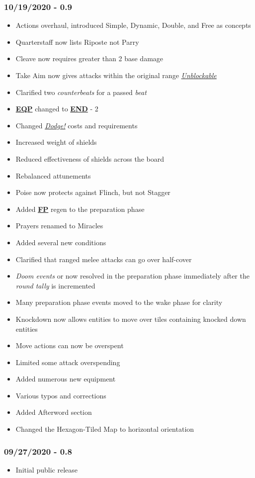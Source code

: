 \documentclass[12pt]{article}
\newcommand{\refto}[1]{\hyperlink{#1}{\textbf{#1}}}
\newcommand{\reftoit}[1]{\hyperlink{#1}{\emph{#1}}}
\begin{document}
\begin{multicols*}{2}
\subsubsection*{10/19/2020 - 0.9}
\begin{itemize}
\item Actions overhaul, introduced Simple, Dynamic, Double, and Free as concepts
\item Quarterstaff now lists Riposte not Parry
\item Cleave now requires greater than 2 base damage
\item Take Aim now gives attacks within the original range \reftoit{Unblockable}
\item Clarified two \emph{counterbeats} for a passed \emph{beat}
\item \refto{EQP} changed to \refto{END} - 2
\item Changed \reftoit{Dodge!} costs and requirements
\item Increased weight of shields
\item Reduced effectiveness of shields across the board
\item Rebalanced attunements
\item Poise now protects against Flinch, but not Stagger
\item Added \refto{FP} regen to the preparation phase
\item Prayers renamed to Miracles
\item Added several new conditions
\item Clarified that ranged melee attacks can go over half-cover
\item \emph{Doom events} or now resolved in the preparation phase immediately after the \emph{round tally} is incremented
\item Many preparation phase events moved to the wake phase for clarity
\item Knockdown now allows entities to move over tiles containing knocked down entities
\item Move actions can now be overspent
\item Limited some attack overspending
\item Added numerous new equipment
\item Various typos and corrections
\item Added Afterword section
\item Changed the Hexagon-Tiled Map to horizontal orientation
\end{itemize}
\subsubsection*{09/27/2020 - 0.8}
\begin{itemize}
\item Initial public release
\end{itemize}

\end{multicols*}
\end{document}
